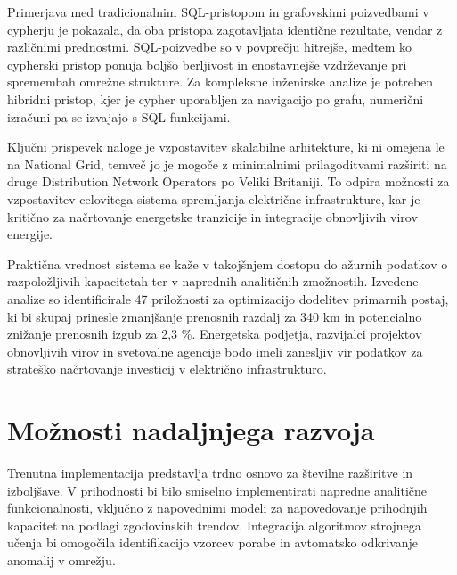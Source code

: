 \documentclass[a4paper,12pt,openright]{book}
\begin{document}
Primerjava med tradicionalnim SQL-pristopom in grafovskimi poizvedbami v cypherju je pokazala, da oba pristopa zagotavljata identične rezultate, vendar z različnimi prednostmi. SQL-poizvedbe so v povprečju hitrejše, medtem ko cypherski pristop ponuja boljšo berljivost in enostavnejše vzdrževanje pri spremembah omrežne strukture. Za kompleksne inženirske analize je potreben hibridni pristop, kjer je cypher uporabljen za navigacijo po grafu, numerični izračuni pa se izvajajo s SQL-funkcijami.

Ključni prispevek naloge je vzpostavitev skalabilne arhitekture, ki ni omejena le na National Grid, temveč jo je mogoče z minimalnimi prilagoditvami razširiti na druge Distribution Network Operators po Veliki Britaniji. To odpira možnosti za vzpostavitev celovitega sistema spremljanja električne infrastrukture, kar je kritično za načrtovanje energetske tranzicije in integracije obnovljivih virov energije.

Praktična vrednost sistema se kaže v takojšnjem dostopu do ažurnih podatkov o razpoložljivih kapacitetah ter v naprednih analitičnih zmožnostih. Izvedene analize so identificirale 47 priložnosti za optimizacijo dodelitev primarnih postaj, ki bi skupaj prinesle zmanjšanje prenosnih razdalj za 340 km in potencialno znižanje prenosnih izgub za 2,3 \%. Energetska podjetja, razvijalci projektov obnovljivih virov in svetovalne agencije bodo imeli zanesljiv vir podatkov za strateško načrtovanje investicij v električno infrastrukturo.



\section{Možnosti nadaljnjega razvoja}

Trenutna implementacija predstavlja trdno osnovo za številne razširitve in izboljšave. V prihodnosti bi bilo smiselno implementirati napredne analitične funkcionalnosti, vključno z napovednimi modeli za napovedovanje prihodnjih kapacitet na podlagi zgodovinskih trendov. Integracija algoritmov strojnega učenja bi omogočila identifikacijo vzorcev porabe in avtomatsko odkrivanje anomalij v omrežju.
\end{document}
